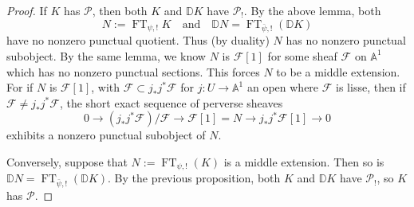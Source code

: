 \begin{proof}
If \(K\) has \(\mathcal{P}\), then both \(K\) and \(\mathbb{D}K\) have
\(\mathcal{P}_!\). By the above lemma, both
\[
  N:=\operatorname{FT}_{\psi,!}K
  \quad\text{and}\quad
  \mathbb{D}N=\operatorname{FT}_{\bar{\psi},!}(\mathbb{D}K)
\]
have no nonzero punctual quotient. Thus (by duality) \(N\) has no nonzero
punctual subobject. By the same lemma, we know \(N\) is \(\mathcal{F}[1]\) for
some sheaf \(\mathcal{F}\) on \(\mathbb{A}^1\) which has no nonzero punctual
sections. This forces \(N\) to be a middle extension. For if
\(N\) is \(\mathcal{F}[1]\), with
\(\mathcal{F}\subset j_*j^*\mathcal{F}\) for \(j:U\to\mathbb{A}^1\) an open
where \(\mathcal{F}\) is lisse, then if
\(\mathcal{F}\neq j_*j^*\mathcal{F}\), the short exact sequence of perverse
sheaves
\[
  0\to (j_*j^*\mathcal{F})/\mathcal{F}
  \to \mathcal{F}[1]=N
  \to j_*j^*\mathcal{F}[1]\to 0
\]
exhibits a nonzero punctual subobject of \(N\).

Conversely, suppose that \(N:=\operatorname{FT}_{\psi,!}(K)\) is a middle
extension. Then so is
\(\mathbb{D}N=\operatorname{FT}_{\bar{\psi},!}(\mathbb{D}K)\). By the previous
proposition, both \(K\) and \(\mathbb{D}K\) have \(\mathcal{P}_!\), so \(K\)
has \(\mathcal{P}\).
\end{proof}

